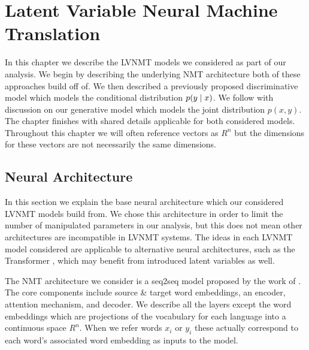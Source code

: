 \chapter{Latent Variable Neural Machine Translation}

In this chapter we describe the \ac{LVNMT} models we considered as part of our analysis. We begin by describing the underlying \ac{NMT} architecture both of these approaches build off of. We then described a previously proposed discriminative model which models the conditional distribution $p(y \; | \;{x})$. We follow with discussion on our generative model which models the joint distribution $p(x, y)$. The chapter finishes with shared details applicable for both considered models. Throughout this chapter we will often reference vectors as $R^{n}$ but the dimensions for these vectors are not necessarily the same dimensions. 


\section{Neural Architecture}

In this section we explain the base neural architecture which our considered \ac{LVNMT} models build from. We chose this architecture in order to limit the number of manipulated parameters in our analysis, but this does not mean other architectures are incompatible in \ac{LVNMT} systems. The ideas in each \ac{LVNMT} model considered are applicable to alternative neural architectures, such as the Transformer \cite{vaswani2017attentionTransformer}, which may benefit from introduced latent variables as well. 

The \ac{NMT} architecture we consider is a \ac{seq2seq} model proposed by the work of  \citet{bahdanau2014NMTBYJoint}. The core components include source \& target word embeddings, an encoder, attention mechanism, and decoder. We describe all the layers except the word embeddings which are projections of the vocabulary for each language into a continuous space $R^{n}$. When we refer  words $x_{i}$ or $y_{i}$ these actually correspond to each word's associated word embedding as inputs to the model.  

